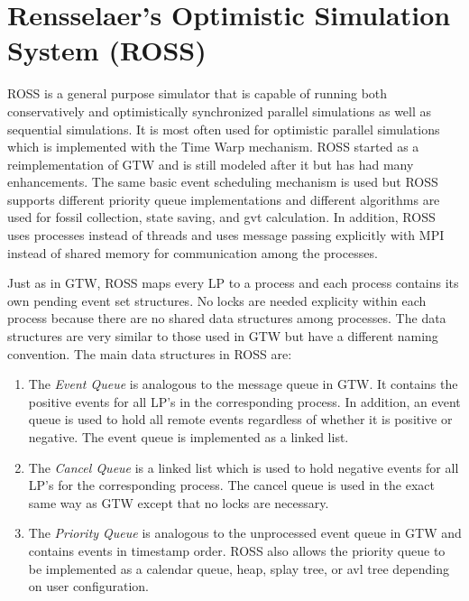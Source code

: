\documentclass[11pt]{book}
\begin{document}
\section{Rensselaer's Optimistic Simulation System (ROSS)}

ROSS\cite{carothers-00} is a general purpose simulator that is capable of running both
conservatively and optimistically synchronized parallel simulations as well as sequential
simulations.  It is most often used for optimistic parallel simulations which is implemented
with the Time Warp mechanism.  ROSS started as a reimplementation of GTW and is still
modeled after it but has had many enhancements.  The same basic event scheduling mechanism is
used but ROSS supports different priority queue implementations and different algorithms
are used for fossil collection, state saving, and gvt calculation.  In addition, ROSS uses
processes instead of threads and uses message passing explicitly with MPI instead of shared
memory for communication among the processes.

Just as in GTW, ROSS maps every LP to a process and each process contains its own pending
event set structures.  No locks are needed explicity within each process because there are
no shared data structures among processes.  The data structures are very similar to those
used in GTW but have a different naming convention.  The main data structures in ROSS are:

\begin{enumerate}
    \item The \emph{Event Queue} is analogous to the message queue in GTW.  It contains the
        positive events for all LP's in the corresponding process.  In addition, an event
        queue is used to hold all remote events regardless of whether it is positive or
        negative.  The event queue is implemented as a linked list.
    \item The \emph{Cancel Queue} is a linked list which is used to hold negative events
        for all LP's for the corresponding process.  The cancel queue is used in the exact
        same way as GTW except that no locks are necessary.
    \item The \emph{Priority Queue} is analogous to the unprocessed event queue in GTW and
        contains events in timestamp order.  ROSS also allows the priority queue to be
        implemented as a calendar queue, heap, splay tree, or avl tree depending on user
        configuration.
\end{enumerate}
\end{document}
